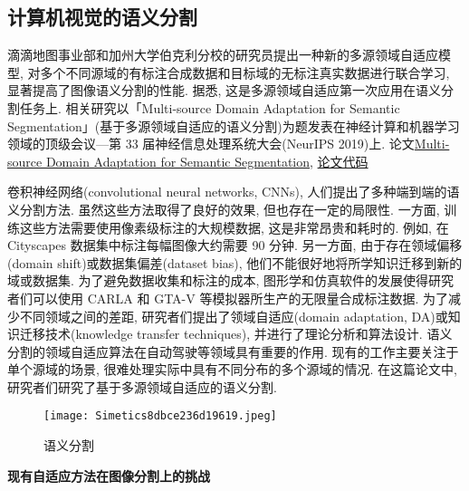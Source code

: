 \subsection{计算机视觉的语义分割}
滴滴地图事业部和加州大学伯克利分校的研究员提出一种新的多源领域自适应模型, 对多个不同源域的有标注合成数据和目标域的无标注真实数据进行联合学习, 显著提高了图像语义分割的性能. 据悉, 这是多源领域自适应第一次应用在语义分割任务上. 相关研究以「Multi-source Domain Adaptation for Semantic Segmentation」(基于多源领域自适应的语义分割)为题发表在神经计算和机器学习领域的顶级会议—第 33 届神经信息处理系统大会(NeurIPS 2019)上.
论文\href{https://arxiv.org/abs/1910.12181}{Multi-source Domain Adaptation for Semantic Segmentation},  \href{https://github.com/Luodian/MADAN}{论文代码}

卷积神经网络(convolutional neural networks,  CNNs), 人们提出了多种端到端的语义分割方法. 虽然这些方法取得了良好的效果, 但也存在一定的局限性. 一方面, 训练这些方法需要使用像素级标注的大规模数据, 这是非常昂贵和耗时的. 例如, 在 Cityscapes 数据集中标注每幅图像大约需要 90 分钟. 另一方面, 由于存在领域偏移(domain shift)或数据集偏差(dataset bias), 他们不能很好地将所学知识迁移到新的域或数据集. 为了避免数据收集和标注的成本, 图形学和仿真软件的发展使得研究者们可以使用 CARLA 和 GTA-V 等模拟器所生产的无限量合成标注数据.
为了减少不同领域之间的差距, 研究者们提出了领域自适应(domain adaptation,  DA)或知识迁移技术(knowledge transfer techniques), 并进行了理论分析和算法设计. 语义分割的领域自适应算法在自动驾驶等领域具有重要的作用. 现有的工作主要关注于单个源域的场景, 很难处理实际中具有不同分布的多个源域的情况. 在这篇论文中, 研究者们研究了基于多源领域自适应的语义分割.
\begin{figure}[H]
	\centering
	\texttt{[image: Simetics8dbce236d19619.jpeg]}
	\caption{语义分割}
   \label{Simetics8dbce236d19619}
\end{figure}
\textbf{现有自适应方法在图像分割上的挑战}

